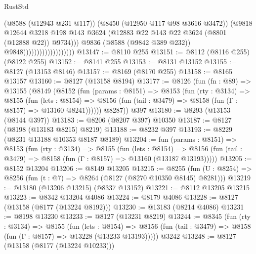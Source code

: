\begin{lexlean}{RustStd}
\begin{coremodule}
                                            (@8588 (@12943 @231 @117))
                                            (@8450 (@12950 @117 @98 @3616 @3472))
                                            (@9818
                                              @12644
                                              @3218
                                              @198
                                              @143
                                              @3624
                                              (@12883
                                                @22
                                                @143
                                                @22
                                                @3624
                                                (@8801 (@12888 @22))
                                                @9734)))
                                          @9836
                                          (@8588 (@9842 @389 @232))
                                          @9848)))))))))))))))))))
@13147 := @8110 @255
@13151 := @8112 (@8116 @255) (@8122 @255)
@13152 := @8141 @255
@13153 := @8131 @13152
@13155 := @8127 (@13153 @8146)
@13157 := @8169 (@8170 @255)
@13158 := @8165 @13157
@13160 := @8127 (@13158 @8194)
@13177 := @8126
    (fun (fn : @89) =>
    @13155
      (@8149
        (@8152
          (fun (params : @8151) =>
          @8153
            (fun (rty : @3134) =>
            @8155
              (fun (lets : @8154) =>
              @8156 (fun (tail : @3479) => @8158 (fun (Γ : @8157) => @13160 @8241))))))
        @8287))
    @397
@13180 := @8293 (@13153 (@8144 @397))
@13183 := @8206 (@8207 @397) @10350
@13187 := @8127 (@8198 (@13183 @8215) @8219)
@13188 := @8232 @397
@13193 := @8229 (@8231 @13188 @10353 @8187 @8189)
@13204 := fun (params : @8151) =>
  @8153
    (fun (rty : @3134) =>
    @8155
      (fun (lets : @8154) =>
      @8156 (fun (tail : @3479) => @8158 (fun (Γ : @8157) => @13160 (@13187 @13193)))))
@13205 := @8152 @13204
@13206 := @8149 @13205
@13215 := @8255
    (fun (U : @8254) => @8256 (fun (t : @7) => @8264 (@8127 (@8270 @10350 @8145) @8281)))
@13219 := @13180 (@13206 @13215) (@8337 @13152)
@13221 := @8112 @13205 @13215
@13223 := @8342 @13204 @4086
@13224 := @8179 @4086
@13228 := @8127 (@13158 (@8177 (@13224 @8192)))
@13230 := @13183 (@8214 @4086)
@13231 := @8198 @13230
@13233 := @8127 (@13231 @8219)
@13244 := @8345
    (fun (rty : @3134) =>
    @8155
      (fun (lets : @8154) =>
      @8156 (fun (tail : @3479) => @8158 (fun (Γ : @8157) => @13228 (@13233 @13193)))))
    @3242
@13248 := @8127 (@13158 (@8177 (@13224 @10233)))

\end{coremodule}
\end{lexlean}
